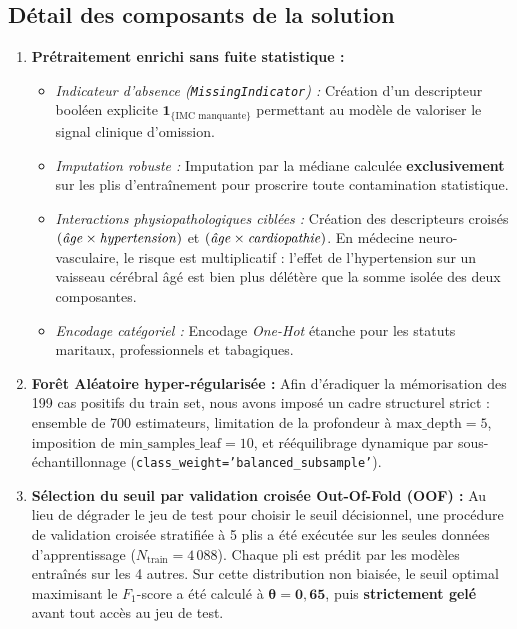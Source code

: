 \documentclass[11pt,a4paper]{article}
\begin{document}
\subsection{Détail des composants de la solution}

\begin{enumerate}[label=\textbf{\arabic*.}]
    \item \textbf{Prétraitement enrichi sans fuite statistique :}
    \begin{itemize}
        \item \emph{Indicateur d'absence (\texttt{MissingIndicator}) :} Création d'un descripteur booléen explicite $\mathbf{1}_{\{\text{IMC manquante}\}}$ permettant au modèle de valoriser le signal clinique d'omission.
        \item \emph{Imputation robuste :} Imputation par la médiane calculée \textbf{exclusivement} sur les plis d'entraînement pour proscrire toute contamination statistique.
        \item \emph{Interactions physiopathologiques ciblées :} Création des descripteurs croisés $(\text{\emph{âge}} \times \text{\emph{hypertension}})$ et $(\text{\emph{âge}} \times \text{\emph{cardiopathie}})$. En médecine neuro-vasculaire, le risque est multiplicatif : l'effet de l'hypertension sur un vaisseau cérébral âgé est bien plus délétère que la somme isolée des deux composantes.
        \item \emph{Encodage catégoriel :} Encodage \emph{One-Hot} étanche pour les statuts maritaux, professionnels et tabagiques.
    \end{itemize}

    \item \textbf{Forêt Aléatoire hyper-régularisée :}
    Afin d'éradiquer la mémorisation des 199 cas positifs du train set, nous avons imposé un cadre structurel strict : ensemble de 700 estimateurs, limitation de la profondeur à $\text{max\_depth} = 5$, imposition de $\text{min\_samples\_leaf} = 10$, et rééquilibrage dynamique par sous-échantillonnage (\texttt{class\_weight='balanced\_subsample'}).

    \item \textbf{Sélection du seuil par validation croisée Out-Of-Fold (OOF) :}
    Au lieu de dégrader le jeu de test pour choisir le seuil décisionnel, une procédure de validation croisée stratifiée à 5 plis a été exécutée sur les seules données d'apprentissage ($N_{\text{train}} = 4\,088$). Chaque pli est prédit par les modèles entraînés sur les 4 autres. Sur cette distribution non biaisée, le seuil optimal maximisant le $F_1$-score a été calculé à $\boldsymbol{\theta = 0{,}65}$, puis \textbf{strictement gelé} avant tout accès au jeu de test.


\end{enumerate}
\end{document}
